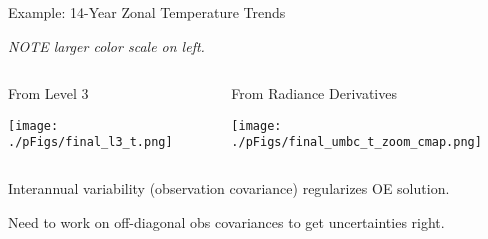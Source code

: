 \documentclass[10pt,t]{beamer}
\begin{document}
\begin{frame}[label={sec:org5deaece}]{Example: 14-Year Zonal Temperature Trends}
\vspace{-0.1in}

\small \emph{NOTE larger color scale on left.}

\vspace{-0.1in}

\begin{columns}
\begin{column}{0.55\columnwidth}
\begin{block}{\footnotesize From Level 3}
\begin{center}
\texttt{[image: ./pFigs/final\_l3\_t.png]}
\end{center}
\end{block}
\end{column}

\begin{column}{0.55\columnwidth}
\begin{block}{\footnotesize From Radiance Derivatives}
\begin{center}
\texttt{[image: ./pFigs/final\_umbc\_t\_zoom\_cmap.png]}
\end{center}
\end{block}
\end{column}
\end{columns}

Interannual variability (observation covariance) regularizes OE solution.

Need to work on off-diagonal obs covariances to get uncertainties right.
\end{frame}
\end{document}
